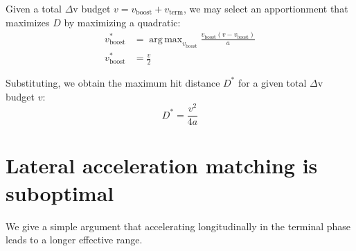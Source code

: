 \documentclass{article}
\DeclareMathOperator*{\argmax}{arg\,max}
\begin{document}
Given a total $\Delta$v budget $v = v_\text{boost} + v_\text{term}$, we may
select an apportionment that maximizes $D$ by maximizing a quadratic:
\begin{align}
v_\text{boost}^* &= \argmax_{v_\text{boost}}
    \frac{v_\text{boost} (v - v_\text{boost})}{a} \\
v_\text{boost}^* &= \frac{v}{2}
\end{align}

Substituting, we obtain the maximum hit distance $D^*$ for a given total
$\Delta$v budget $v$:
\begin{equation}
D^* = \frac{v^2}{4a}
\end{equation}

\section{Lateral acceleration matching is suboptimal}

We give a simple argument that accelerating longitudinally in the terminal phase
leads to a longer effective range.

\balance

\newpage


\end{document}
